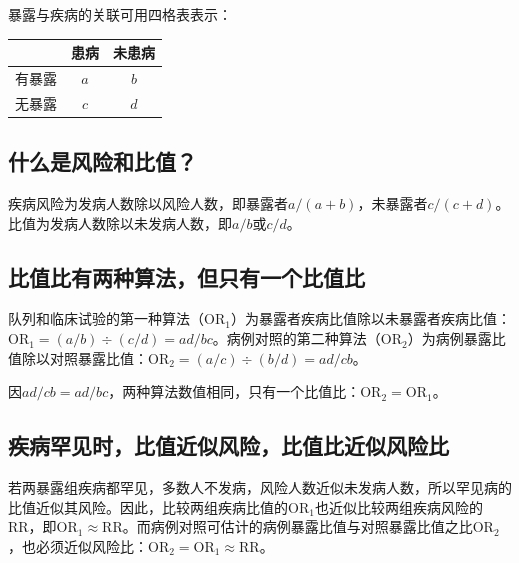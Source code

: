 暴露与疾病的关联可用四格表表示：
\begin{center}\begin{tabular}{lcc}\toprule&患病&未患病\\\midrule
有暴露&$a$&$b$\\无暴露&$c$&$d$\\\bottomrule\end{tabular}\end{center}
\subsection{什么是风险和比值？}
疾病风险为发病人数除以风险人数，即暴露者$a/(a+b)$，未暴露者$c/(c+d)$。比值为发病人数除以未发病人数，即$a/b$或$c/d$。
\subsection{比值比有两种算法，但只有一个比值比}
队列和临床试验的第一种算法（OR$_1$）为暴露者疾病比值除以未暴露者疾病比值：$\mathrm{OR}_1=(a/b)\div(c/d)=ad/bc$。病例对照的第二种算法（OR$_2$）为病例暴露比值除以对照暴露比值：$\mathrm{OR}_2=(a/c)\div(b/d)=ad/cb$。

因$ad/cb=ad/bc$，两种算法数值相同，只有一个比值比：$\mathrm{OR}_2=\mathrm{OR}_1$。
\subsection{疾病罕见时，比值近似风险，比值比近似风险比}
若两暴露组疾病都罕见，多数人不发病，风险人数近似未发病人数，所以罕见病的比值近似其风险。因此，比较两组疾病比值的OR$_1$也近似比较两组疾病风险的RR，即$\mathrm{OR}_1\approx\mathrm{RR}$。而病例对照可估计的病例暴露比值与对照暴露比值之比OR$_2$，也必须近似风险比：$\mathrm{OR}_2=\mathrm{OR}_1\approx\mathrm{RR}$。

